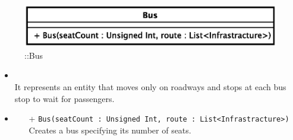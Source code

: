 \begin{figure}[h]
\centering
\includegraphics[scale=0.6,keepaspectratio]{images/solution/app/backend/bus.eps}
\caption{\pActive::Bus}
\label{fig:sd-app-bus}
\end{figure}
\FloatBarrier
\begin{itemize}
  \item \textbf{\descr} \\
It represents an entity that moves only on roadways and stops at each bus stop to
wait for passengers.
\item \textbf{\ops}
  \begin{itemize}
  \item[+] \texttt{Bus(seatCount : Unsigned Int, route : List<Infrastracture>)} \\
Creates a bus specifying its number of seats.
  \end{itemize}
\end{itemize} 
